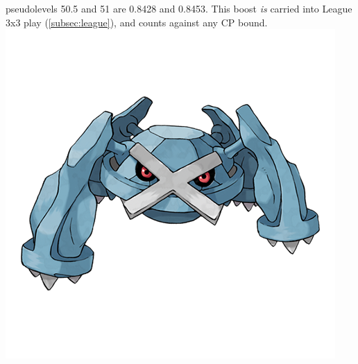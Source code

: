   pseudolevels 50.5 and 51 are 0.8428 and 0.8453.
This boost \textit{is} carried into League 3x3 play (\autoref{subsec:league}),
  and counts against any CP bound.
\vfill
\includegraphics[width=.9\linewidth,keepaspectratio]{images/metagross.png}
